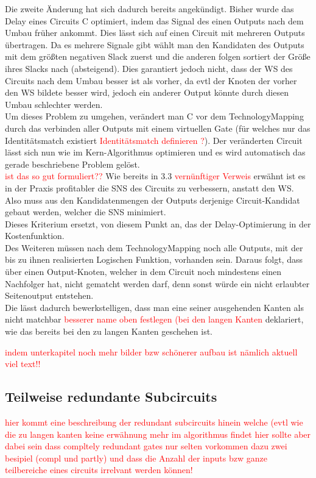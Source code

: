 \documentclass[11pt, a4paper, german]{article}
\newcommand{\TM}{TechnologyMapping }
\begin{document}
Die zweite Änderung hat sich dadurch bereits angekündigt. Bisher wurde das Delay eines Circuits C optimiert, indem das Signal des einen Outputs nach dem Umbau früher ankommt. Dies lässt sich auf einen Circuit mit mehreren Outputs übertragen. Da es mehrere Signale gibt wählt man den Kandidaten des Outputs mit dem größten negativen Slack zuerst und die anderen folgen sortiert der Größe ihres Slacks nach (absteigend). Dies garantiert jedoch nicht, dass der WS des Circuits nach dem Umbau besser ist als vorher, da evtl der Knoten der vorher den WS bildete besser wird, jedoch ein anderer Output könnte durch diesen Umbau schlechter werden. \\
Um dieses Problem zu umgehen, verändert man C vor dem \TM durch das verbinden aller Outputs mit einem virtuellen Gate (für welches nur das Identitätsmatch existiert \textcolor{red}{Identitätsmatch definieren ?}). Der veränderten Circuit lässt sich nun wie im Kern-Algorithmus optimieren und es wird automatisch das gerade beschriebene Problem gelöst.\\ 
\textcolor{red}{ist das so gut formuliert?? } 
Wie bereits in 3.3 \textcolor{red}{vernünftiger Verweis}  erwähnt ist es in der Praxis profitabler die SNS des Circuits zu verbessern, anstatt den WS.\\
Also muss aus den Kandidatenmengen der Outputs derjenige Circuit-Kandidat gebaut werden, welcher die SNS minimiert.\\
 Dieses Kriterium ersetzt, von diesem Punkt an,  das der Delay-Optimierung in der Kostenfunktion.\\
 
 Des Weiteren müssen nach dem \TM noch alle Outputs, mit der bis zu ihnen realisierten Logischen Funktion, vorhanden sein. Daraus folgt, dass über einen Output-Knoten, welcher in dem Circuit noch mindestens einen Nachfolger hat, nicht gematcht werden darf, denn sonst würde ein nicht erlaubter Seitenoutput entstehen.\\
 Die lässt dadurch bewerkstelligen, dass man eine seiner ausgehenden Kanten als nicht matchbar \textcolor{red}{besserer name oben festlegen (bei den langen Kanten} deklariert, wie das bereits bei den zu langen Kanten geschehen ist. 

 \textcolor{red}{ indem unterkapitel noch mehr bilder bzw schönerer aufbau ist nämlich aktuell viel text!!}
 
 \subsection{Teilweise redundante Subcircuits}
 \textcolor{red}{hier kommt eine beschreibung der redundant subcircuits hinein welche (evtl wie die zu langen kanten keine erwähnung mehr im algorithmus findet  hier sollte aber dabei sein dass compltely redundant gates nur selten vorkommen dazu zwei besipiel (compl und partly) und dass die Anzahl der inputs bzw ganze teilbereiche eines circuits irrelvant werden können!}
 
\end{document}
